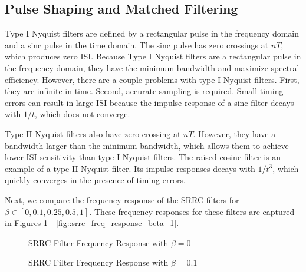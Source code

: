 \documentclass{article}
\begin{document}
\subsection{Pulse Shaping and Matched Filtering}

Type I Nyquist filters are defined by a rectangular pulse in the frequency domain and a sinc pulse in the time domain. The sinc pulse has zero crossings at $nT$, which produces zero ISI. Because Type I Nyquist filters are a rectangular pulse in the frequency-domain, they have the minimum bandwidth and maximize spectral efficiency. However, there are a couple problems with type I Nyquist filters. First, they are infinite in time. Second, accurate sampling is required. Small timing errors can result in large ISI because the impulse response of a sinc filter decays with $1/t$, which does not converge.

Type II Nyquist filters also have zero crossing at $nT$. However, they have a bandwidth larger than the minimum bandwidth, which allows them to achieve lower ISI sensitivity than type I Nyquist filters. The raised cosine filter is an example of a type II Nyquist filter. Its impulse responses decays with $1/t^3$, which quickly converges in the presence of timing errors.

Next, we compare the frequency response of the SRRC filters for $\beta \in [0,0.1,0.25,0.5,1]$. These frequency responses for these filters are captured in Figures \ref{fig::srrc_freq_response_beta_0} - \ref{fig::srrc_freq_response_beta_1}.

\begin{figure}[H]
	\centerline{}
	\caption{SRRC Filter Frequency Response with $\beta=0$}
	\label{fig::srrc_freq_response_beta_0}
\end{figure}

\begin{figure}[H]
	\centerline{}
	\caption{SRRC Filter Frequency Response with $\beta=0.1$}
	\label{fig::srrc_freq_response_beta_0_1}
\end{figure}
\end{document}
